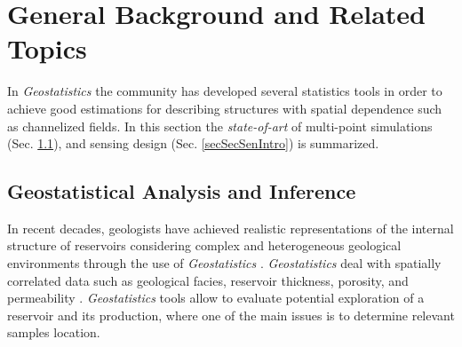 \chapter{General Background and Related Topics} 
\label{sec_intro_GB}

In \emph{Geostatistics} the community has developed several statistics tools in order to achieve good estimations for describing structures with spatial dependence such as channelized fields. In this section the \emph{state-of-art} of multi-point simulations (Sec. \ref{secSecGeoIntro}), and sensing design (Sec. \ref{secSecSenIntro}) is summarized.


\section{Geostatistical Analysis and Inference}
\label{secSecGeoIntro}

In recent decades, geologists have achieved realistic representations of the internal structure of reservoirs considering complex and heterogeneous geological environments through the use of \textit{Geostatistics} \citep{Arpat_2007_a, bittencourthorne1997, Strebelle_2004a, Man_2013_a, Holden_1998_a, Journel2004}. \textit{Geostatistics} deal with spatially correlated data such as geological facies, reservoir thickness, porosity, and permeability \citep{Oliver_2008_a, Raef_2015_a, Calderon2016_a, Calderon2019_a}. \emph{Geostatistics} tools allow to evaluate potential exploration of a reservoir and its production, where one of the main issues is to determine relevant samples location.


